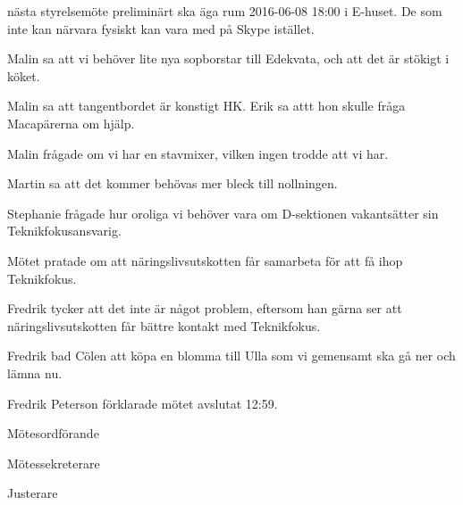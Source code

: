 \documentclass[10pt]{article}
\def\mo{Fredrik Peterson}
\def\ms{Erik Månsson}
\def\ji{Johan Persson}
\begin{document}
\begin{paragrafer}
\Mba nästa styrelsemöte preliminärt ska äga rum 2016-06-08 18:00 i E-huset. De som inte kan närvara fysiskt kan vara med på Skype istället.

\Ibfu

Malin sa att vi behöver lite nya sopborstar till Edekvata, och att det är stökigt i köket.

Malin sa att tangentbordet är konstigt HK. Erik sa attt hon skulle fråga Macapärerna om hjälp.

Malin frågade om vi har en stavmixer, vilken ingen trodde att vi har.

Martin sa att det kommer behövas mer bleck till nollningen.

Stephanie frågade hur oroliga vi behöver vara om D-sektionen vakantsätter sin Teknikfokusansvarig.

Mötet pratade om att näringslivsutskotten får samarbeta för att få ihop Teknikfokus.

Fredrik tycker att det inte är något problem, eftersom han gärna ser att näringslivsutskotten får bättre kontakt med Teknikfokus.

Fredrik bad Cölen att köpa en blomma till Ulla som vi gemensamt ska gå ner och lämna nu.

{\mo} förklarade mötet avslutat 12:59.

\end{paragrafer}

\newpage
\hidesignfoot
\begin{signatures}{3}
\signature{\mo}{Mötesordförande}
\signature{\ms}{Mötessekreterare}
\signature{\ji}{Justerare}
\end{signatures}
\end{document}
